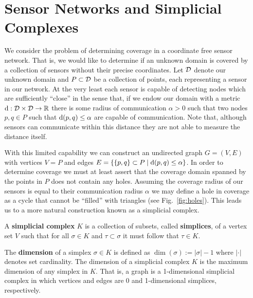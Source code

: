 \section{Sensor Networks and Simplicial Complexes} %
\label{sec:complexes}

We consider the problem of determining coverage in a coordinate free sensor network.
That is, we would like to determine if an unknown domain is covered by a collection of sensors without their precise coordinates.
Let ${\mathcal{D}}$ denote our unknown domain and $P\subset{\mathcal{D}}$ be a collection of points, each representing a sensor in our network.
At the very least each sensor is capable of detecting nodes which are sufficiently ``close'' in the sense that, if we endow our domain with a metric $\mathrm{d}:{\mathcal{D}}\times{\mathcal{D}}\to\mathbb{R}$ there is some radius of communication $\alpha > 0$ such that two nodes $p, q\in P$ such that $\mathrm{d}(p, q) \leq\alpha$ are capable of communication.
Note that, although sensors can communicate within this distance they are not able to measure the distance itself.

With this limited capability we can construct an undirected graph $G=(V,E)$ with vertices $V=P$ and edges $E = \{\{p, q\}\subset P\mid \mathrm{d}(p,q)\leq\alpha\}$.
In order to determine coverage we must at least assert that the coverage domain spanned by the points in $P$ does not contain any holes.
Assuming the coverage radius of our sensors is equal to their communication radius $\alpha$ we may define a hole in coverage as a cycle that cannot be ``filled'' with triangles (see Fig.~\ref{fig:holes}).
This leads us to a more natural construction known as a simplicial complex.
\begin{definition}
   A \textbf{simplicial complex} $K$ is a collection of subsets, called \textbf{simplices}, of a vertex set $V$ such that for all $\sigma\in K$ and $\tau\subset\sigma$ it must follow that $\tau\in K$.
\end{definition}
The \textbf{dimension} of a simplex $\sigma\in K$ is defined as $\dim(\sigma) := |\sigma|-1$ where $|\cdot|$ denotes set cardinality.
The dimension of a simplicial complex $K$ is the maximum dimension of any simplex in $K$.
That is, a graph is a 1-dimensional simplicial complex in which vertices and edges are 0 and 1-dimensional simplices, respectively.

